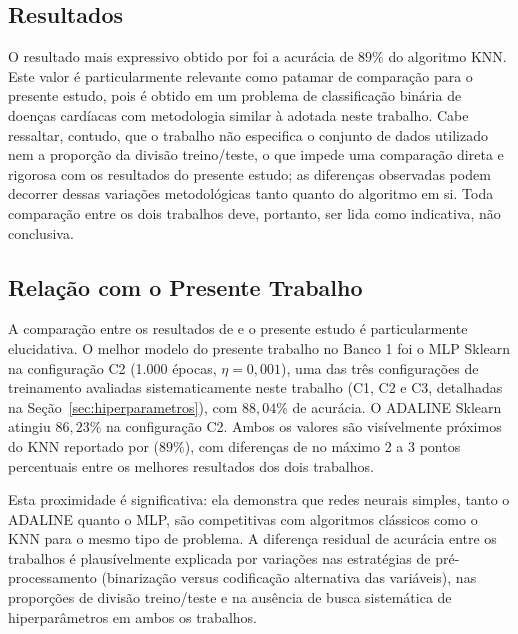 \subsection{Resultados}

O resultado mais expressivo obtido por  foi a acur\'acia de $89\%$ do algoritmo KNN. Este valor \'e particularmente relevante como patamar de compara\c c\~ao para o presente estudo, pois \'e obtido em um problema de classifica\c c\~ao bin\'aria de doen\c cas card\'iacas com metodologia similar \`a adotada neste trabalho. Cabe ressaltar, contudo, que o trabalho n\~ao especifica o conjunto de dados utilizado nem a propor\c c\~ao da divis\~ao treino/teste, o que impede uma compara\c c\~ao direta e rigorosa com os resultados do presente estudo; as diferen\c cas observadas podem decorrer dessas varia\c c\~oes metodol\'ogicas tanto quanto do algoritmo em si. Toda compara\c c\~ao entre os dois trabalhos deve, portanto, ser lida como indicativa, n\~ao conclusiva.

\subsection{Rela\c c\~ao com o Presente Trabalho}

A compara\c c\~ao entre os resultados de  e o presente estudo \'e particularmente elucidativa. O melhor modelo do presente trabalho no Banco 1 foi o MLP Sklearn na configura\c c\~ao C2 (1.000 \'epocas, $\eta = 0{,}001$), uma das tr\^es configura\c c\~oes de treinamento avaliadas sistematicamente neste trabalho (C1, C2 e C3, detalhadas na Se\c c\~ao~\ref{sec:hiperparametros}), com $88{,}04\%$ de acur\'acia. O ADALINE Sklearn atingiu $86{,}23\%$ na configura\c c\~ao C2. Ambos os valores s\~ao vis\'ivelmente pr\'oximos do KNN reportado por  ($89\%$), com diferen\c cas de no m\'aximo 2 a 3 pontos percentuais entre os melhores resultados dos dois trabalhos.

Esta proximidade \'e significativa: ela demonstra que redes neurais simples, tanto o ADALINE quanto o MLP, s\~ao competitivas com algoritmos cl\'assicos como o KNN para o mesmo tipo de problema. A diferen\c ca residual de acur\'acia entre os trabalhos \'e plaus\'ivelmente explicada por varia\c c\~oes nas estrat\'egias de pr\'e-processamento (binariza\c c\~ao versus codifica\c c\~ao alternativa das vari\'aveis), nas propor\c c\~oes de divis\~ao treino/teste e na aus\^encia de busca sistem\'atica de hiperpar\^ametros em ambos os trabalhos.

